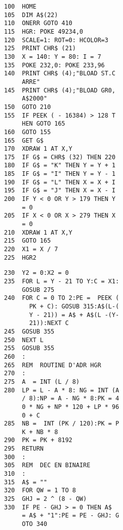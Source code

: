 \begin{minipage}{.325\textwidth}
\begin{tiny}
\begin{framed}
\begin{verbatim}
100  HOME 
105  DIM A$(22)
110  ONERR GOTO 410
115  HGR: POKE 49234,0
120  SCALE=1: ROT=0: HCOLOR=3
125  PRINT CHR$ (21)
130  X = 140: Y = 80: I = 7
135  POKE 232,0: POKE 233,96
140  PRINT CHR$ (4);"BLOAD ST.C
     ARRE"
145  PRINT CHR$ (4);"BLOAD GR0,
     A$2000"
150  GOTO 210
155  IF PEEK ( - 16384) > 128 T
     HEN GOTO 165
160  GOTO 155
165  GET G$
170  XDRAW 1 AT X,Y
175  IF G$ = CHR$ (32) THEN 220
180  IF G$ = "K" THEN Y = Y + 1
185  IF G$ = "I" THEN Y = Y - 1
190  IF G$ = "L" THEN X = X + I
195  IF G$ = "J" THEN X = X - I
200  IF Y < 0 OR Y > 179 THEN Y
     = 0
205  IF X < 0 OR X > 279 THEN X
     = 0
210  XDRAW 1 AT X,Y
215  GOTO 165
220  X1 = X / 7
225  HGR2
\end{verbatim}
\vspace{-2\baselineskip}
\end{framed}
\end{tiny}
\end{minipage}
%
\hfill
%
\begin{minipage}{.325\textwidth}
\begin{tiny}
\begin{framed}
\begin{verbatim}
230  Y2 = 0:X2 = 0
235  FOR L = Y - 21 TO Y:C = X1:
     GOSUB 275
240  FOR C = 0 TO 2:PE =  PEEK (
       PK + C): GOSUB 315:A$(L-(
       Y - 21)) = A$ + A$(L -(Y-
       21)):NEXT C
245  GOSUB 355
250  NEXT L
255  GOSUB 355
260  :
265  REM  ROUTINE D'ADR HGR
270  :
275  A  = INT (L / 8)
280  LP = L - A * 8: NG = INT (A
     / 8):NP = A - NG * 8:PK = 4
     0 * NG + NP * 120 + LP * 96
     0 + C
285  NB =  INT (PK / 120):PK = P
     K + NB * 8
290  PK = PK + 8192
295  RETURN 
300  :
305  REM  DEC EN BINAIRE
310  :
315  A$ = ""
320  FOR QW = 1 TO 8
325  GHJ = 2 ^ (8 - QW)
330  IF PE - GHJ > = 0 THEN A$
     = A$ + "1":PE = PE - GHJ: G
     OTO 340
\end{verbatim}
\vspace{-2\baselineskip}
\end{framed}
\end{tiny}
\end{minipage}
%
\hfill
%
